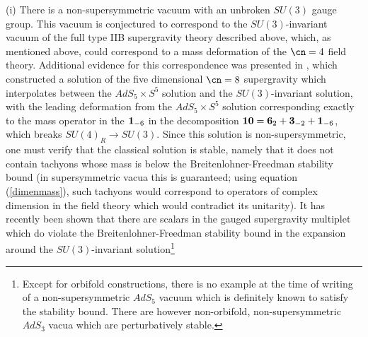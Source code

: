 \begin{itemize}
 (i) There is a non-supersymmetric vacuum with an unbroken $SU(3)$
 gauge group. This vacuum is conjectured to correspond to the
 $SU(3)$-invariant vacuum of the full type IIB supergravity theory
 described above, which, as mentioned above, could correspond to a
 mass deformation of the $\cn=4$ field theory. Additional evidence for
 this correspondence was presented in
 \cite{Girardello:1998pd,Distler:1998gb}, which constructed a solution
 of the five dimensional $\cn=8$ supergravity which interpolates
 between the $AdS_5\times S^5$ solution and the $SU(3)$-invariant
 solution, with the leading deformation from the $AdS_5\times S^5$
 solution corresponding exactly to the mass operator in the ${\bf
 1}_{-6}$ in the decomposition ${\bf 10} = {\bf 6}_2 + {\bf 3}_{-2} +
 {\bf 1}_{-6}$, which breaks $SU(4)_R \to SU(3)$. 
 Since this solution is non-supersymmetric, one must
 verify that the classical solution is stable, namely that it does not
 contain tachyons whose mass is below the Breitenlohner-Freedman
 stability bound (in supersymmetric vacua this is guaranteed; using
 equation (\ref{dimenmass}), such tachyons would correspond to operators
 of complex dimension in the field theory which would contradict its
 unitarity). 
 It has recently been shown \cite{KPPrivate} that there are scalars in
 the gauged supergravity multiplet which do violate the
 Breitenlohner-Freedman stability bound in the expansion around the
 $SU(3)$-invariant solution\footnote{
 Except for orbifold constructions, there is no example at the time of
 writing of a non-supersymmetric $AdS_5$ vacuum which is definitely
 known to satisfy the stability bound.  There are however non-orbifold,
 non-supersymmetric $AdS_3$ vacua which are perturbatively stable.}

\end{itemize}
